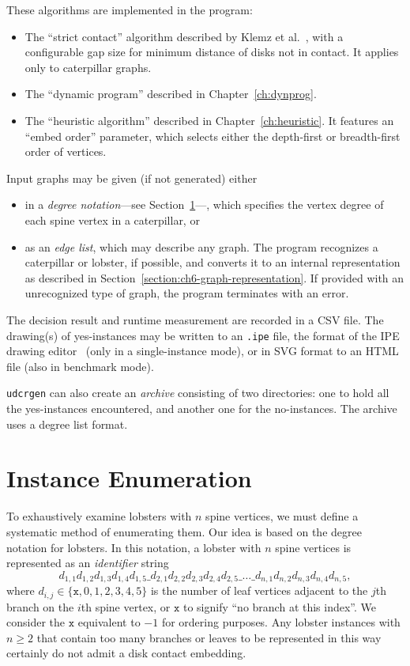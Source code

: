 These algorithms are implemented in the program:

\begin{itemize}
    \item The ``strict contact'' algorithm described by Klemz et al.~\cite{Klemz2015}, with a configurable gap size for minimum distance of disks not in contact. It applies only to caterpillar graphs.
    \item The ``dynamic program'' described in Chapter~\ref{ch:dynprog}.
    \item The ``heuristic algorithm'' described in Chapter~\ref{ch:heuristic}. It features an ``embed order'' parameter, which selects either the depth-first or breadth-first order of vertices.
\end{itemize}

Input graphs may be given (if not generated) either

\begin{itemize}
    \item in a \emph{degree notation}---see Section~\ref{section:ch6-enumeration}---, which specifies the vertex degree of each spine vertex in a caterpillar, or
    \item as an \emph{edge list}, which may describe any graph. The program recognizes a caterpillar or lobster, if possible, and converts it to an internal representation as described in Section~\ref{section:ch6-graph-representation}. If provided with an unrecognized type of graph, the program terminates with an error.
\end{itemize}

The decision result and runtime measurement are recorded in a CSV file. The drawing(s) of yes-instances may be written to an \texttt{.ipe} file, the format of the IPE drawing editor~\cite{cheong_ipe_2022} (only in a single-instance mode), or in SVG format to an HTML file (also in benchmark mode).

\texttt{udcrgen} can also create an \emph{archive} consisting of two directories: one to hold all the yes-instances encountered, and another one for the no-instances. The archive uses a degree list format.

\section{Instance Enumeration}
\label{section:ch6-enumeration}

To exhaustively examine lobsters with $n$ spine vertices, we must define a systematic method of enumerating them. Our idea is based on the degree notation for lobsters. In this notation, a lobster with $n$ spine vertices is represented as an \emph{identifier} string $$d_{1,1}d_{1,2}d_{1,3}d_{1,4}d_{1,5}\_d_{2,1}d_{2,2}d_{2,3}d_{2,4}d_{2,5}\_\ldots\_d_{n,1}d_{n,2}d_{n,3}d_{n,4}d_{n,5},$$ where $d_{i,j} \in \{ \texttt x, 0, 1, 2, 3, 4, 5 \}$ is the number of leaf vertices adjacent to the $j$th branch on the $i$th spine vertex, or $\texttt x$ to signify ``no branch at this index''. We consider the $\texttt x$ equivalent to $-1$ for ordering purposes.
Any lobster instances with $n \geq 2$ that contain too many branches or leaves to be represented in this way certainly do not admit a disk contact embedding.

